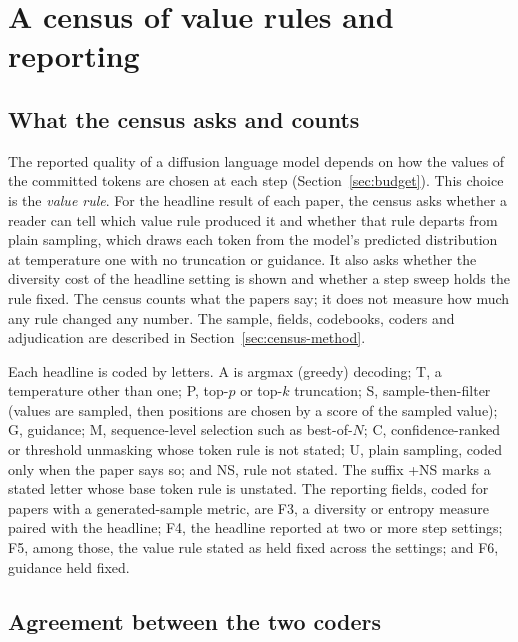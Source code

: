 \section{A census of value rules and reporting}
\label{sec:census}

\subsection{What the census asks and counts}
\label{sec:census-question}

The reported quality of a diffusion language model depends on how the values of the committed tokens are chosen at each step (Section~\ref{sec:budget}). This choice is the \emph{value rule}. For the headline result of each paper, the census asks whether a reader can tell which value rule produced it and whether that rule departs from plain sampling, which draws each token from the model's predicted distribution at temperature one with no truncation or guidance. It also asks whether the diversity cost of the headline setting is shown and whether a step sweep holds the rule fixed. The census counts what the papers say; it does not measure how much any rule changed any number. The sample, fields, codebooks, coders and adjudication are described in Section~\ref{sec:census-method}.

Each headline is coded by letters. A is argmax (greedy) decoding; T, a temperature other than one; P, top-$p$ or top-$k$ truncation; S, sample-then-filter (values are sampled, then positions are chosen by a score of the sampled value); G, guidance; M, sequence-level selection such as best-of-$N$; C, confidence-ranked or threshold unmasking whose token rule is not stated; U, plain sampling, coded only when the paper says so; and NS, rule not stated. The suffix +NS marks a stated letter whose base token rule is unstated. The reporting fields, coded for papers with a generated-sample metric, are F3, a diversity or entropy measure paired with the headline; F4, the headline reported at two or more step settings; F5, among those, the value rule stated as held fixed across the settings; and F6, guidance held fixed.

\subsection{Agreement between the two coders}
\label{sec:census-agreement}

